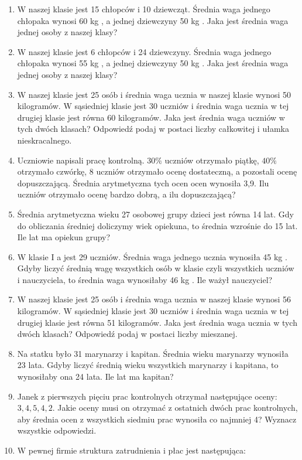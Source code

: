\documentclass[10pt]{article}
\begin{document}
\begin{enumerate}
  \item W naszej klasie jest 15 chłopców i 10 dziewcząt. Średnia waga jednego chłopaka wynosi 60 kg , a jednej dziewczyny 50 kg . Jaka jest średnia waga jednej osoby z naszej klasy?
  \item W naszej klasie jest 6 chłopców i 24 dziewczyny. Średnia waga jednego chłopaka wynosi 55 kg , a jednej dziewczyny 50 kg . Jaka jest średnia waga jednej osoby z naszej klasy?
  \item W naszej klasie jest 25 osób i średnia waga ucznia w naszej klasie wynosi 50 kilogramów. W sąsiedniej klasie jest 30 uczniów i średnia waga ucznia w tej drugiej klasie jest równa 60 kilogramów. Jaka jest średnia waga uczniów w tych dwóch klasach? Odpowiedź podaj w postaci liczby całkowitej i ułamka nieskracalnego.
  \item Uczniowie napisali pracę kontrolną. \(30 \%\) uczniów otrzymało piątkę, \(40 \%\) otrzymało czwórkę, 8 uczniów otrzymało ocenę dostateczną, a pozostali ocenę dopuszczającą. Średnia arytmetyczna tych ocen ocen wynosiła 3,9. Ilu uczniów otrzymało ocenę bardzo dobrą, a ilu dopuszczającą?
  \item Średnia arytmetyczna wieku 27 osobowej grupy dzieci jest równa 14 lat. Gdy do obliczania średniej doliczymy wiek opiekuna, to średnia wzrośnie do 15 lat. Ile lat ma opiekun grupy?
  \item W klasie I a jest 29 uczniów. Średnia waga jednego ucznia wynosiła 45 kg . Gdyby liczyć średnią wagę wszystkich osób w klasie czyli wszystkich uczniów i nauczyciela, to średnia waga wynosiłaby 46 kg . Ile ważył nauczyciel?
  \item W naszej klasie jest 25 osób i średnia waga ucznia w naszej klasie wynosi 56 kilogramów. W sąsiedniej klasie jest 30 uczniów i średnia waga ucznia w tej drugiej klasie jest równa 51 kilogramów. Jaka jest średnia waga ucznia w tych dwóch klasach? Odpowiedź podaj w postaci liczby mieszanej.
  \item Na statku było 31 marynarzy i kapitan. Średnia wieku marynarzy wynosiła 23 lata. Gdyby liczyć średnią wieku wszystkich marynarzy i kapitana, to wynosiłaby ona 24 lata. Ile lat ma kapitan?
  \item Janek z pierwszych pięciu prac kontrolnych otrzymał następujące oceny: \(3,4,5,4,2\). Jakie oceny musi on otrzymać z ostatnich dwóch prac kontrolnych, aby średnia ocen z wszystkich siedmiu prac wynosiła co najmniej 4? Wyznacz wszystkie odpowiedzi.
  \item W pewnej firmie struktura zatrudnienia i płac jest następująca:
\end{enumerate}
\end{document}

